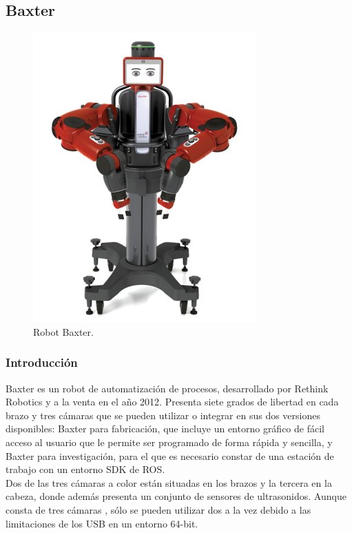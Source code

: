 \subsection{Baxter}

\begin{figure}[H]
	\centering %
	\includegraphics[scale=0.5]{imagenes/baxter1.jpg}
	\caption{Robot Baxter.}
\end{figure}

\subsubsection{Introducción}
\noindent Baxter \cite{Baxter} es un robot de automatización de procesos, desarrollado por Rethink Robotics y a la venta en el año 2012. Presenta siete grados de libertad en cada brazo y tres cámaras que se pueden utilizar o integrar en sus dos versiones disponibles: Baxter para fabricación, que incluye un entorno gráfico de fácil acceso al usuario que le permite ser programado de forma rápida y sencilla, y Baxter para investigación, para el que es necesario constar de una estación de trabajo con un entorno SDK de ROS. \\

\noindent Dos de las tres cámaras a color están situadas en los brazos y la tercera en la cabeza, donde además presenta un conjunto de sensores de ultrasonidos. Aunque consta de tres cámaras \cite{Baxter2}, sólo se pueden utilizar dos a la vez debido a las limitaciones de los USB en un entorno 64-bit.

